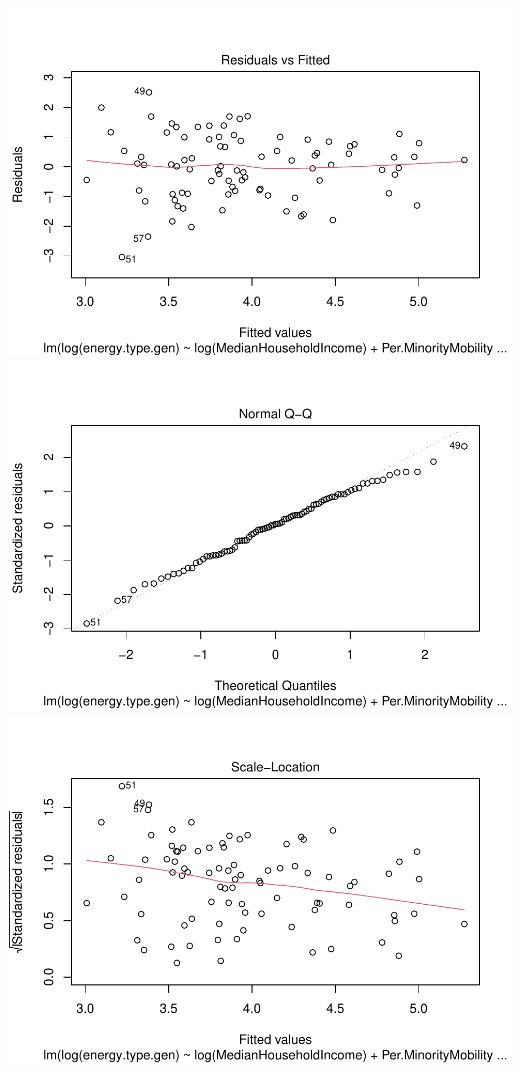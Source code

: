 \documentclass[
  12pt,
]{article}
\begin{document}
\includegraphics{Project_files/figure-latex/unnamed-chunk-6-1.pdf}
\includegraphics{Project_files/figure-latex/unnamed-chunk-6-2.pdf}
\includegraphics{Project_files/figure-latex/unnamed-chunk-6-3.pdf}
\end{document}
